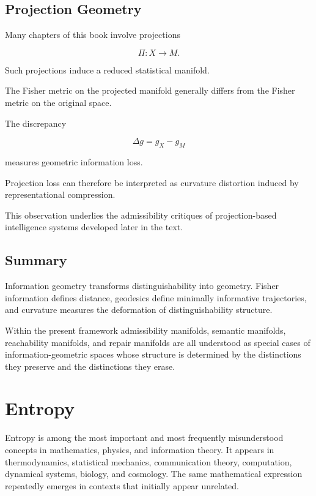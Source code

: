 \documentclass[12pt,twoside,openright]{book}
\begin{document}
\subsection{Projection Geometry}

Many chapters of this book involve projections

\[
\Pi:X\rightarrow M.
\]

Such projections induce a reduced statistical manifold.

The Fisher metric on the projected manifold generally
differs from the Fisher metric on the original space.

The discrepancy

\[
\Delta g
=

g_X-g_M
\]

measures geometric information loss.

Projection loss can therefore be interpreted as curvature
distortion induced by representational compression.

This observation underlies the admissibility critiques of
projection-based intelligence systems developed later in
the text.

\subsection{Summary}

Information geometry transforms distinguishability into
geometry. Fisher information defines distance, geodesics
define minimally informative trajectories, and curvature
measures the deformation of distinguishability structure.

Within the present framework admissibility manifolds,
semantic manifolds, reachability manifolds, and repair
manifolds are all understood as special cases of
information-geometric spaces whose structure is determined
by the distinctions they preserve and the distinctions
they erase.

\section{Entropy}

Entropy is among the most important and most frequently
misunderstood concepts in mathematics, physics, and
information theory. It appears in thermodynamics,
statistical mechanics, communication theory,
computation, dynamical systems, biology, and cosmology.
The same mathematical expression repeatedly emerges in
contexts that initially appear unrelated.
\end{document}
